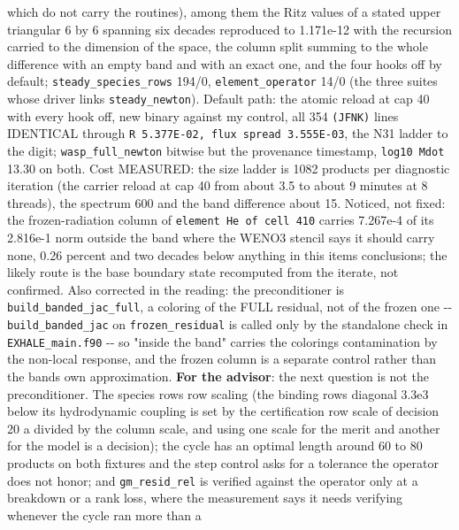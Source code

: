 \documentclass[english,a4paper]{my_memo}
\begin{document}
\begin{itemize}
  which do not carry the routines), among them the Ritz values of a stated
  upper triangular 6 by 6 spanning six decades reproduced to 1.171e-12 with
  the recursion carried to the dimension of the space, the column split
  summing to the whole difference with an empty band and with an exact one,
  and the four hooks off by default; \texttt{steady\_species\_rows} 194/0,
  \texttt{element\_operator} 14/0 (the three suites whose driver links
  \texttt{steady\_newton}). Default path: the atomic reload at cap 40 with every
  hook off, new binary against my control, all 354 \texttt{(JFNK)} lines
  IDENTICAL through \texttt{\textbar{}\textbar{}R\textbar{}\textbar{}\ 5.377E-02,\ flux\ spread\ 3.555E-03}, the N31
  ladder to the digit; \texttt{wasp\_full\_newton} bitwise but the provenance
  timestamp, \texttt{log10\ Mdot} 13.30 on both. Cost MEASURED: the size ladder is
  1082 products per diagnostic iteration (the carrier reload at cap 40 from
  about 3.5 to about 9 minutes at 8 threads), the spectrum 600 and the band
  difference about 15. Noticed, not fixed: the frozen-radiation column of
  \texttt{element\ He\ of\ cell\ 410} carries 7.267e-4 of its 2.816e-1 norm outside
  the band where the WENO3 stencil says it should carry none, 0.26 percent
  and two decades below anything in this item\textquotesingle s conclusions; the likely
  route is the base boundary state recomputed from the iterate, not
  confirmed. Also corrected in the reading: the preconditioner is
  \texttt{build\_banded\_jac\_full}, a coloring of the FULL residual, not of the
  frozen one -\/- \texttt{build\_banded\_jac} on \texttt{frozen\_residual} is called only by
  the standalone check in \texttt{EXHALE\_main.f90} -\/- so "inside the band" carries
  the coloring\textquotesingle s contamination by the non-local response, and the frozen
  column is a separate control rather than the band\textquotesingle s own approximation.
  \textbf{For the advisor}: the next question is not the preconditioner. The
  species rows\textquotesingle{} row scaling (the binding row\textquotesingle s diagonal 3.3e3 below its
  hydrodynamic coupling is set by the certification row scale of decision
  20 a divided by the column scale, and using one scale for the merit and
  another for the model is a decision); the cycle has an optimal length
  around 60 to 80 products on both fixtures and the step control asks for a
  tolerance the operator does not honor; and \texttt{gm\_resid\_rel} is verified
  against the operator only at a breakdown or a rank loss, where the
  measurement says it needs verifying whenever the cycle ran more than a

\end{itemize}
\end{document}
